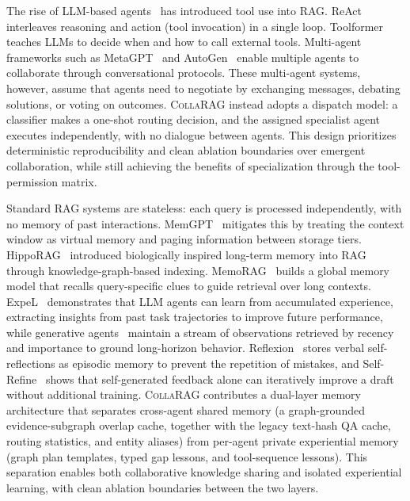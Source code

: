 \documentclass[11pt,a4paper]{article}
\newcommand{\sys}{\textsc{CollaRAG}}
\begin{document}
The rise of LLM-based agents~\citep{xi2023rise} has introduced tool use into RAG.
ReAct~\citep{yao2023react} interleaves reasoning and action (tool invocation) in a single loop.
Toolformer~\citep{schick2023toolformer} teaches LLMs to decide when and how to call external tools.
Multi-agent frameworks such as MetaGPT~\citep{hong2024metagpt} and AutoGen~\citep{wu2024autogen} enable multiple agents to collaborate through conversational protocols.
These multi-agent systems, however, assume that agents need to negotiate by exchanging messages, debating solutions, or voting on outcomes.
\sys{} instead adopts a dispatch model: a classifier makes a one-shot routing decision, and the assigned specialist agent executes independently, with no dialogue between agents.
This design prioritizes deterministic reproducibility and clean ablation boundaries over emergent collaboration, while still achieving the benefits of specialization through the tool-permission matrix.

Standard RAG systems are stateless: each query is processed independently, with no memory of past interactions.
MemGPT~\citep{packer2023memgpt} mitigates this by treating the context window as virtual memory and paging information between storage tiers.
HippoRAG~\citep{gutierrez2024hipporag} introduced biologically inspired long-term memory into RAG through knowledge-graph-based indexing.
MemoRAG~\citep{qian2025memorag} builds a global memory model that recalls query-specific clues to guide retrieval over long contexts.
ExpeL~\citep{zhao2024expel} demonstrates that LLM agents can learn from accumulated experience, extracting insights from past task trajectories to improve future performance, while generative agents~\citep{park2023generative} maintain a stream of observations retrieved by recency and importance to ground long-horizon behavior.
Reflexion~\citep{shinn2023reflexion} stores verbal self-reflections as episodic memory to prevent the repetition of mistakes, and Self-Refine~\citep{madaan2023selfrefine} shows that self-generated feedback alone can iteratively improve a draft without additional training.
\sys{} contributes a dual-layer memory architecture that separates cross-agent shared memory (a graph-grounded evidence-subgraph overlap cache, together with the legacy text-hash QA cache, routing statistics, and entity aliases) from per-agent private experiential memory (graph plan templates, typed gap lessons, and tool-sequence lessons).
This separation enables both collaborative knowledge sharing and isolated experiential learning, with clean ablation boundaries between the two layers.
\end{document}
